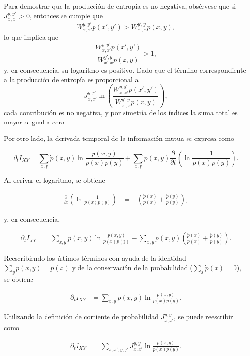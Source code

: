 \begin{appendixs}
Para demostrar que la producción de entropía es no negativa, obsérvese que si \(J_{x,x'}^{y,y'} > 0\), entonces se cumple que
\[
W_{x,x'}^{y,y'} p(x',y') > W_{x',x}^{y',y} p(x,y),
\]
lo que implica que
\[
\frac{W_{x,x'}^{y,y'} p(x',y')}{W_{x',x}^{y',y} p(x,y)} > 1,
\]
y, en consecuencia, su logaritmo es positivo. Dado que el término correspondiente a la producción de entropía es proporcional a 
\[
J_{x,x'}^{y,y'} \ln \left( \frac{W_{x,x'}^{y,y'} p(x',y')}{W_{x',x}^{y',y} p(x,y)} \right),
\]
cada contribución es no negativa, y por simetría de los índices la suma total es mayor o igual a cero.

Por otro lado, la derivada temporal de la información mutua se expresa como

\begin{equation*}
    \partial_{t} I_{XY} = \sum_{x,y} \dot{p}(x,y) \ln \frac{p(x,y)}{p(x)p(y)} 
    + \sum_{x,y} p(x,y) \frac{\partial}{\partial t} \left( \ln \frac{1}{p(x)p(y)} \right).
\end{equation*}

Al derivar el logaritmo, se obtiene

\begin{align*}
    \frac{\partial}{\partial t} \left( \ln \frac{1}{p(x)p(y)} \right) 
    &= - \left( \frac{\dot{p}(x)}{p(x)} + \frac{\dot{p}(y)}{p(y)} \right),
\end{align*}

y, en consecuencia,

\begin{align*}
    \partial_{t} I_{XY} 
    &= \sum_{x,y} \dot{p}(x,y) \ln \frac{p(x,y)}{p(x)p(y)} 
    - \sum_{x,y} p(x,y) \left( \frac{\dot{p}(x)}{p(x)} + \frac{\dot{p}(y)}{p(y)} \right).
\end{align*}

Reescribiendo los últimos términos con ayuda de la identidad \(\sum_{y} p(x,y) = p(x)\) y de la conservación de la probabilidad (\(\sum_{x} \dot{p}(x) = 0\)), se obtiene

\begin{align}
    \partial_{t} I_{XY} 
    &= \sum_{x,y} \dot{p}(x,y) \ln \frac{p(x,y)}{p(x)p(y)}.
\end{align}

Utilizando la definición de corriente de probabilidad \(J_{x,x'}^{y,y'}\), se puede reescribir como

\begin{align}
    \partial_{t} I_{XY} 
    &= \sum_{x,x';y,y'} J_{x,x'}^{y,y'} \ln \frac{p(x,y)}{p(x)p(y)}.
\end{align}


\end{appendixs}

